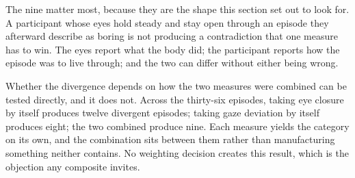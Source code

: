 The nine matter most, because they are the shape this section set out to look for.
A participant whose eyes hold steady and stay open through an episode they afterward describe as
boring is not producing a contradiction that one measure has to win. The eyes report what the
body did; the participant reports how the episode was to live through; and the two can differ
without either being wrong.

Whether the divergence depends on how the two measures were combined can be tested directly, and
it does not. Across the thirty-six episodes, taking eye closure by itself produces twelve
divergent episodes; taking gaze deviation by itself produces eight; the two combined produce
nine. Each measure yields the category on its own, and the combination sits between them rather
than manufacturing something neither contains. No weighting decision creates this result, which
is the objection any composite invites.

%
